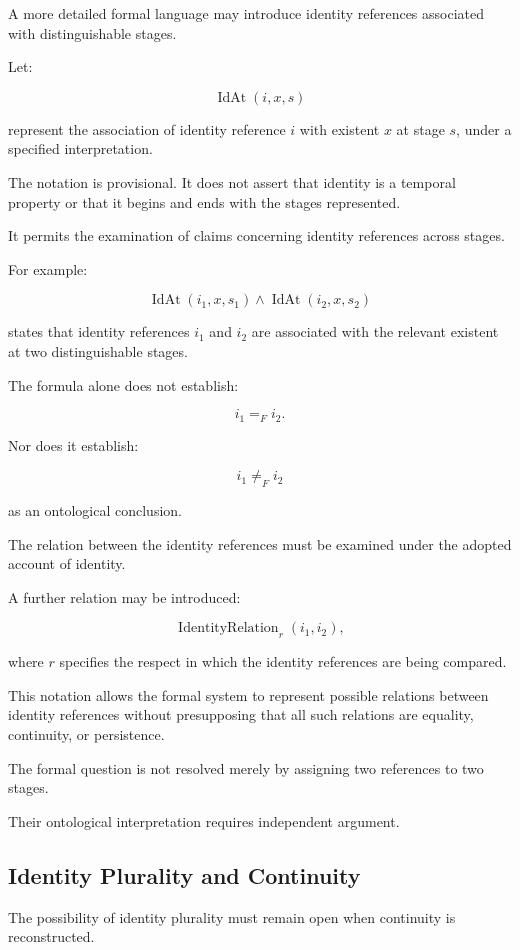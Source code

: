 A more detailed formal
language may introduce
identity references associated
with distinguishable stages.

Let:

\[
    \operatorname{IdAt}(i,x,s)
\]

represent the association
of identity reference \(i\)
with existent \(x\) at
stage \(s\), under a
specified interpretation.

The notation is provisional.
It does not assert that
identity is a temporal
property or that it
begins and ends with
the stages represented.

It permits the examination
of claims concerning
identity references across
stages.

For example:

\[
    \operatorname{IdAt}(i_1,x,s_1)
    \land
    \operatorname{IdAt}(i_2,x,s_2)
\]

states that identity references
\(i_1\) and \(i_2\) are
associated with the relevant
existent at two distinguishable
stages.

The formula alone does
not establish:

\[
    i_1 =_F i_2.
\]

Nor does it establish:

\[
    i_1 \neq_F i_2
\]

as an ontological conclusion.

The relation between
the identity references
must be examined under
the adopted account of
identity.

A further relation may
be introduced:

\[
    \operatorname{IdentityRelation}_{r}(i_1,i_2),
\]

where \(r\) specifies
the respect in which
the identity references
are being compared.

This notation allows
the formal system to
represent possible relations
between identity references
without presupposing
that all such relations
are equality, continuity,
or persistence.

The formal question is
not resolved merely
by assigning two references
to two stages.

Their ontological interpretation
requires independent
argument.

\subsection{Identity Plurality and Continuity}

The possibility of identity
plurality must remain
open when continuity
is reconstructed.


